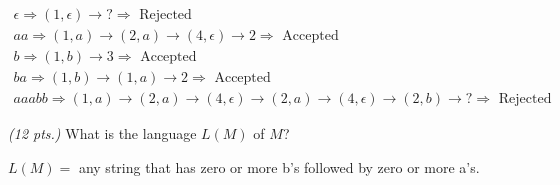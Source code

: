 \documentclass[11pt]{article}
\begin{document}
\begin{qunlist}
\begin{qparts}
    \begin{solution}
      \begin{gather}
        \epsilon \Rightarrow (1,\epsilon) \rightarrow ? \Rightarrow \mbox{  Rejected}\\
        aa \Rightarrow (1,a) \rightarrow (2,a) \rightarrow (4,\epsilon) \rightarrow 2 \Rightarrow \mbox{  Accepted}\\
        b \Rightarrow (1,b) \rightarrow 3 \Rightarrow \mbox{  Accepted}\\
        ba \Rightarrow (1,b) \rightarrow (1,a) \rightarrow 2 \Rightarrow \mbox{  Accepted}\\
        aaabb \Rightarrow (1,a) \rightarrow (2,a) \rightarrow (4,\epsilon) \rightarrow (2,a) \rightarrow (4,\epsilon) \rightarrow (2,b) \rightarrow ? \Rightarrow \mbox{  Rejected}
      \end{gather}
    \end{solution}

    \item \emph{(12 pts.)}
    What is the language $L(M)$ of $M$?
    \begin{solution}
      $L(M) = $ any string that has zero or more b's followed by zero or more a's.
    \end{solution}
  \end{qparts}

  \newpage


\end{qunlist}
\end{document}

